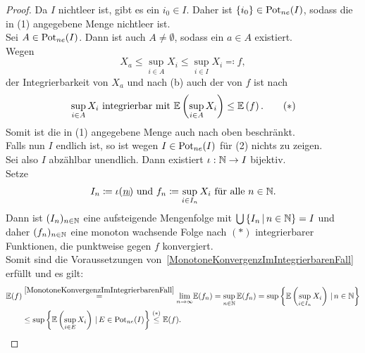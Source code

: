 \begin{proof}
Da $I$ nichtleer ist, gibt es ein $i_0 \in I$. Daher ist
$\left\{i_0\right\}\in\mathop{\textrm{Pot}}\nolimits_{ne}(I)$, sodass die in (1) angegebene Menge nichtleer
ist.\\
Sei $A \in \mathop{\textrm{Pot}}\nolimits_{ne}(I)$. Dann ist auch $A \neq \emptyset$, sodass ein
$a \in A$ existiert.\\
Wegen
\[X_a \le \sup_{i \in A}X_i \le \sup_{i \in I}X_i \eqqcolon f,\]
der Integrierbarkeit von $X_a$ und nach (b) auch der von $f$
ist nach~
\begin{align}\sup_{i \in A}X_i \text{ integrierbar mit }
\mathbb{E}\left(\sup_{i \in A}X_i \right) \le  \mathbb{E}\left(f \right)\text. \tag{$\ast$}
\end{align}
Somit ist die in (1) angegebene Menge auch nach oben beschränkt.\\
Falls nun $I$ endlich ist, so ist wegen $I \in \mathop{\textrm{Pot}}\nolimits_{ne}(I)$ für (2) nichts zu
zeigen.\\
Sei also $I$ abzählbar unendlich.
Dann existiert $\iota: \mathbb{N} \rightarrow I$ bijektiv.\\
Setze
\[I_n \coloneqq  \iota(\haken n) \text{ und } f_n\coloneqq  \sup_{i \in I_n}X_i
\text{ für alle } n \in \N\text.\]
Dann ist $(I_{n})_{n \in \mathbb{N}}$ eine aufsteigende Mengenfolge mit
$\bigcup\left\{I_n\,|\,n \in \mathbb{N}\right\} = I$ und daher $(f_{n})_{n \in \mathbb{N}}$ eine monoton
wachsende Folge nach $(\ast)$ integrierbarer Funktionen, die punktweise gegen
$f$ konvergiert.\\
Somit sind die Voraussetzungen von~\ref{MonotoneKonvergenzImIntegrierbarenFall}
erfüllt und es gilt:
\begin{align*}
\mathbb{E}(f)& \overset{\ref{MonotoneKonvergenzImIntegrierbarenFall}}=
\underset{n\to \infty}{\lim} \mathbb{E}(f_n) = \sup_{n \in \mathbb{N}}\mathbb{E}(f_n)
= \sup\left\{\mathbb{E}\left(\sup_{i \in I_n}X_i \right)\,|\,n \in \mathbb{N}\right\}\\
&\le\sup\left\{\mathbb{E}\left(\sup_{i \in E}X_i \right)\,|\,E \in \mathop{\textrm{Pot}}\nolimits_{ne}(I)\right\}
\overset{(\ast)} \le \mathbb{E}(f)\text.
\end{align*}
\end{proof}
